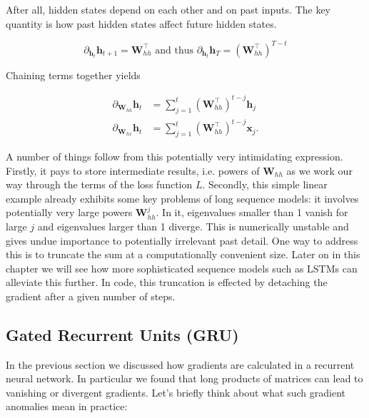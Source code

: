 After all, hidden states depend on each other and on past inputs. The key quantity is how past hidden states affect future hidden states.

$$\partial_{\mathbf{h}_t} \mathbf{h}_{t+1} = \mathbf{W}_{hh}^\top \text{ and thus } \partial_{\mathbf{h}_t} \mathbf{h}_T = \left(\mathbf{W}_{hh}^\top\right)^{T-t}$$

Chaining terms together yields

$$
\begin{aligned}
\partial_{\mathbf{W}_{hh}} \mathbf{h}_t & = \sum_{j=1}^t \left(\mathbf{W}_{hh}^\top\right)^{t-j} \mathbf{h}_j \\
\partial_{\mathbf{W}_{hx}} \mathbf{h}_t & = \sum_{j=1}^t \left(\mathbf{W}_{hh}^\top\right)^{t-j} \mathbf{x}_j.
\end{aligned}
$$

A number of things follow from this potentially very intimidating expression. Firstly, it pays to store intermediate results, i.e. powers of $\mathbf{W}_{hh}$ as we work our way through the terms of the loss function $L$. Secondly, this simple linear example already exhibits some key problems of long sequence models: it involves potentially very large powers $\mathbf{W}_{hh}^j$. In it, eigenvalues smaller than 1 vanish for large $j$ and eigenvalues larger than 1 diverge. This is numerically unstable and gives undue importance to potentially irrelevant past detail. One way to address this is to truncate the sum at a computationally convenient size. Later on in this chapter we will see how more sophisticated sequence models such as LSTMs can alleviate this further. In code, this truncation is effected by detaching the gradient after a given number of steps.

\subsection{Gated Recurrent Units (GRU)}\label{subsec:gru}

In the previous section we discussed how gradients are calculated in a recurrent neural network. In particular we found that long products of matrices can lead to vanishing or divergent gradients. Let’s briefly think about what such gradient anomalies mean in practice:

